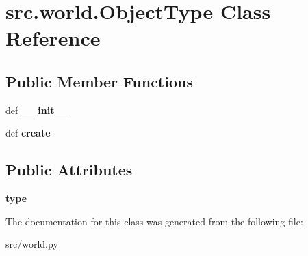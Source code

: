 \hypertarget{classsrc_1_1world_1_1_object_type}{\section{src.\-world.\-Object\-Type \-Class \-Reference}
\label{classsrc_1_1world_1_1_object_type}
}
\subsection*{\-Public \-Member \-Functions}
\begin{DoxyCompactItemize}
\item 
\hypertarget{classsrc_1_1world_1_1_object_type_ac8a8a5e2f760dc7ad47a122c2f81260a}{def {\bfseries \-\_\-\-\_\-init\-\_\-\-\_\-}}\label{classsrc_1_1world_1_1_object_type_ac8a8a5e2f760dc7ad47a122c2f81260a}

\item 
\hypertarget{classsrc_1_1world_1_1_object_type_ad802e763a2a37cccc20b98e1d6b35fb6}{def {\bfseries create}}\label{classsrc_1_1world_1_1_object_type_ad802e763a2a37cccc20b98e1d6b35fb6}

\end{DoxyCompactItemize}
\subsection*{\-Public \-Attributes}
\begin{DoxyCompactItemize}
\item 
\hypertarget{classsrc_1_1world_1_1_object_type_a9a72a17c18cf9dcf1e078609ca81aa3a}{{\bfseries type}}\label{classsrc_1_1world_1_1_object_type_a9a72a17c18cf9dcf1e078609ca81aa3a}

\end{DoxyCompactItemize}


\-The documentation for this class was generated from the following file\-:\begin{DoxyCompactItemize}
\item 
src/world.\-py\end{DoxyCompactItemize}
